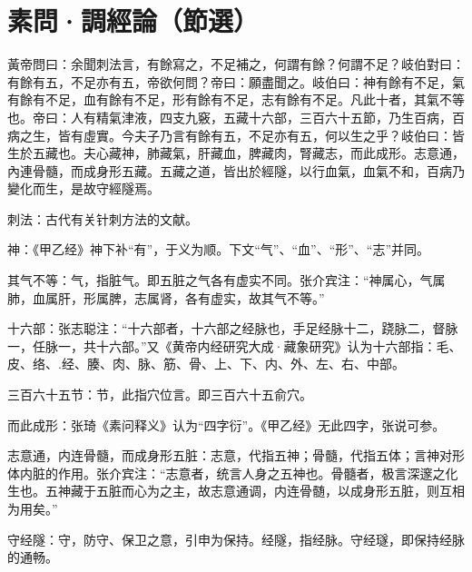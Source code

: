 \documentclass[draft,12pt]{ctexbook}
\begin{document}
\section{素問·調經論（節選）}%


\begin{yuanwen}
黃帝問曰：余聞刺法言，有餘寫之，不足補之，何謂有餘？何謂不足？岐伯對曰：有餘有五，不足亦有五，帝欲何問？帝曰：願盡聞之。岐伯曰：神有餘有不足，氣有餘有不足，血有餘有不足，形有餘有不足，志有餘有不足。凡此十者，其氣不等也。帝曰：人有精氣津液，四支九竅，五藏十六部，三百六十五節，乃生百病，百病之生，皆有虛實。今夫子乃言有餘有五，不足亦有五，何以生之乎？岐伯曰：皆生於五藏也。夫心藏神，肺藏氣，肝藏血，脾藏肉，腎藏志，而此成形。志意通，內連骨髓，而成身形五藏。五藏之道，皆出於經隧，以行血氣，血氣不和，百病乃變化而生，是故守經隧焉。
\end{yuanwen}


\begin{jiaozhu}
	\item 刺法：古代有关针刺方法的文献。
	\item 神：《甲乙经》神下补“有”，于义为顺。下文“气”、“血”、“形”、“志”并同。
	\item 其气不等：气，指脏气。即五脏之气各有虚实不同。张介宾注：“神属心，气属肺，血属肝，形属脾，志属肾，各有虚实，故其气不等。”
	\item 十六部：张志聪注：“十六部者，十六部之经脉也，手足经脉十二，跷脉二，督脉一，任脉一，共十六部。”又《黄帝内经研究大成·藏象研究》认为十六部指：毛、皮、络、.经、腠、肉、脉、筋、骨、上、下、内、外、左、右、中部。
	\item 三百六十五节：节，此指穴位言。即三百六十五俞穴。
	\item 而此成形：张琦《素问释义》认为“四字衍”。《甲乙经》无此四字，张说可参。
	\item 志意通，内连骨髓，而成身形五脏：志意，代指五神；骨髓，代指五体；言神对形体内脏的作用。张介宾注：“志意者，统言人身之五神也。骨髓者，极言深邃之化生也。五神藏于五脏而心为之主，故志意通调，内连骨髄，以成身形五脏，则互相为用矣。”
	\item 守经隧：守，防守、保卫之意，引申为保持。经隧，指经脉。守经璲，即保持经脉的通畅。
\end{jiaozhu}


\end{document}
